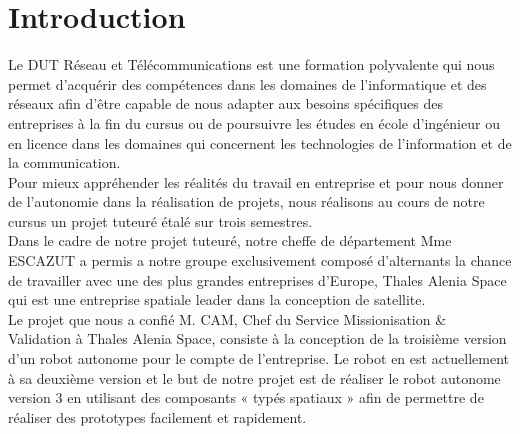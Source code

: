 \documentclass{PackagerQualityN}
\begin{document}
\newp       %
\setcounter{tocdepth}{2}
\tableofcontents
{}





\newp
{} %
\section*{Introduction}
Le DUT Réseau et Télécommunications est une formation polyvalente qui nous permet d’acquérir des compétences dans les domaines de l’informatique et des réseaux afin d’être capable de nous adapter aux besoins spécifiques des entreprises à la fin du cursus ou de poursuivre les études en école d’ingénieur ou en licence dans les domaines qui concernent les technologies de l’information et de la communication.\\

Pour mieux appréhender les réalités du travail en entreprise et pour nous donner de l’autonomie dans la réalisation de projets, nous réalisons au cours de notre cursus un projet tuteuré étalé sur trois semestres.\\

Dans le cadre de notre projet tuteuré, notre cheffe de département Mme ESCAZUT a permis a notre groupe exclusivement composé d’alternants la chance de travailler avec une des plus grandes entreprises d’Europe, Thales Alenia Space qui est une entreprise spatiale leader dans la conception de satellite.\\

Le projet que nous a confié M. CAM, Chef du Service Missionisation \& Validation à Thales Alenia Space, consiste à la conception de la troisième version d’un robot autonome pour le compte de l’entreprise. Le robot en est actuellement à sa deuxième version et le but de notre projet est de réaliser le robot autonome version 3 en utilisant des composants « typés spatiaux » afin de permettre de réaliser des prototypes facilement et rapidement.\\
\end{document}
